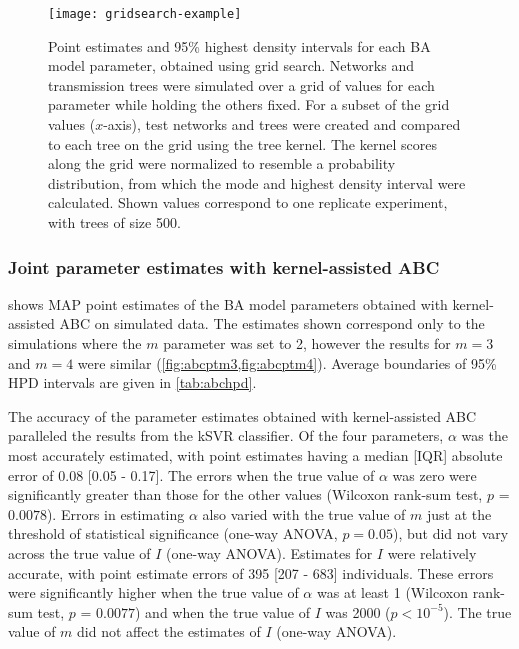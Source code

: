 \begin{figure}[ht]
  \centering
  \texttt{[image: gridsearch-example]}
  \caption[Grid search estimates of \gls{BA} model parameters.]{Point estimates
      and 95\% highest density intervals for each \gls{BA} model parameter,
      obtained using grid search. Networks and transmission trees were
      simulated over a grid of values for each parameter while holding the
      others fixed. For a subset of the grid values ($x$-axis), test networks
      and trees were created and compared to each tree on the grid using the
      tree kernel. The kernel scores along the grid were normalized to resemble
      a probability distribution, from which the mode and highest density
      interval were calculated. Shown values correspond to one replicate
      experiment, with trees of size 500.
  } 
  \label{fig:gridest}
\end{figure}

\subsubsection*{Joint parameter estimates with kernel-assisted ABC}



 shows \gls{MAP} point estimates of the BA model parameters
obtained with kernel-assisted ABC on simulated data. The estimates shown correspond only
to the simulations where the $m$ parameter was set to 2, however the results
for $m = 3$ and $m = 4$ were similar (\cref{fig:abcptm3,fig:abcptm4}). Average
boundaries of 95\% HPD intervals are given in \cref{tab:abchpd}.

The accuracy of the parameter estimates obtained with kernel-assisted ABC
paralleled the results from the \gls{kSVR} classifier. Of the four parameters,
$\alpha$ was the most accurately estimated, with point estimates having a
median [IQR] absolute error of 
    0.08 
    [0.05 - 
    0.17].
The errors when the true value of $\alpha$ was zero were significantly greater
than those for the other values 
    (Wilcoxon rank-sum test, $p$ = $0.0078$).
Errors in estimating $\alpha$ also varied with the true value of $m$ just at
the threshold of statistical significance
    (one-way ANOVA, $p 
    =0.05$),
but did not vary across the true value of $I$ (one-way ANOVA). Estimates for
$I$ were relatively accurate, with point estimate errors of
    395 
    [207 - 
    683] individuals.
These errors were significantly higher when the true value of $\alpha$ was
at least 1
    (Wilcoxon rank-sum test, $p$ = $0.0077$)
and when the true value of $I$ was 2000 ($p < 10^{-5}$). The true value of $m$
did not affect the estimates of $I$ (one-way ANOVA).

